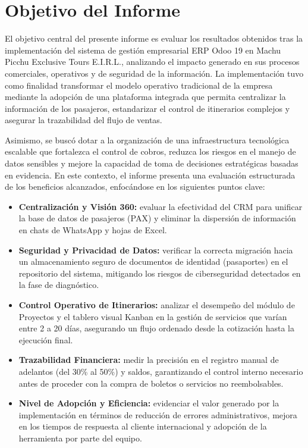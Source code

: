 \section{Objetivo del Informe}

El objetivo central del presente informe es evaluar los resultados obtenidos tras la
implementación del sistema de gestión empresarial ERP Odoo 19 en Machu Picchu Exclusive
Tours E.I.R.L., analizando el impacto generado en sus procesos comerciales, operativos y de
seguridad de la información. La implementación tuvo como finalidad transformar el modelo
operativo tradicional de la empresa mediante la adopción de una plataforma integrada que
permita centralizar la información de los pasajeros, estandarizar el control de itinerarios
complejos y asegurar la trazabilidad del flujo de ventas.

Asimismo, se buscó dotar a la organización de una infraestructura tecnológica escalable que
fortalezca el control de cobros, reduzca los riesgos en el manejo de datos sensibles y mejore
la capacidad de toma de decisiones estratégicas basadas en evidencia. En este contexto, el
informe presenta una evaluación estructurada de los beneficios alcanzados, enfocándose en los
siguientes puntos clave:

\begin{itemize}
    \item \textbf{Centralización y Visión 360\textdegree:} evaluar la efectividad del CRM para unificar la base de datos de pasajeros (PAX) y eliminar la dispersión de información en chats de WhatsApp y hojas de Excel.
    \item \textbf{Seguridad y Privacidad de Datos:} verificar la correcta migración hacia un almacenamiento seguro de documentos de identidad (pasaportes) en el repositorio del sistema, mitigando los riesgos de ciberseguridad detectados en la fase de diagnóstico.
    \item \textbf{Control Operativo de Itinerarios:} analizar el desempeño del módulo de Proyectos y el tablero visual Kanban en la gestión de servicios que varían entre 2 a 20 días, asegurando un flujo ordenado desde la cotización hasta la ejecución final.
    \item \textbf{Trazabilidad Financiera:} medir la precisión en el registro manual de adelantos (del 30\% al 50\%) y saldos, garantizando el control interno necesario antes de proceder con la compra de boletos o servicios no reembolsables.
    \item \textbf{Nivel de Adopción y Eficiencia:} evidenciar el valor generado por la implementación en términos de reducción de errores administrativos, mejora en los tiempos de respuesta al cliente internacional y adopción de la herramienta por parte del equipo.
\end{itemize}
